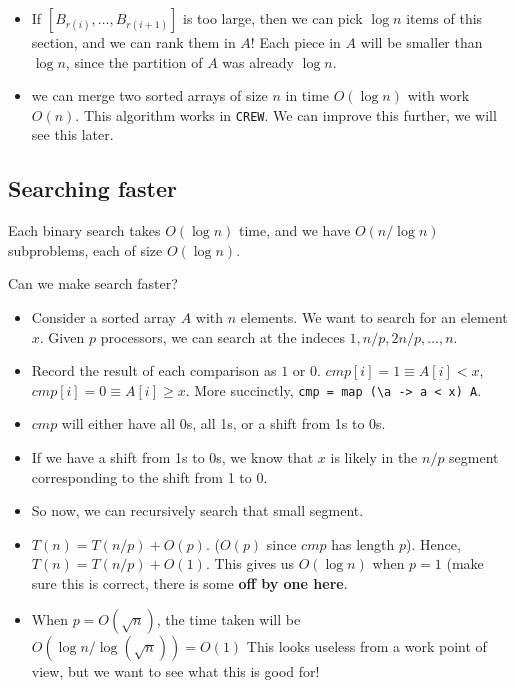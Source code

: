 \begin{itemize}
    \item If $[B_{r(i)}, \dots, B_{r(i + 1)}]$ is too large, then we can
        pick $\log n$ items of this section, and we can rank them in $A$!
        Each piece in $A$ will be smaller than $\log n$, since the partition
        of $A$ was already $\log n$.

    \item we can merge two sorted arrays of size $n$ in time $O(\log n)$
        with work $O(n)$.  This algorithm works in \texttt{CREW}.
        We can improve this  further, we will see this later.
\end{itemize}

\subsection{Searching faster}

Each binary search takes $O(\log n)$ time, and we have $O(n / \log n)$ subproblems,
each of size $O(\log n)$. 

Can we make search faster?

\begin{itemize}
    \item Consider a sorted array $A$ with $n$ elements. We want to search
        for an element $x$.
        Given $p$ processors, we can search at the indeces $1, n / p, 2n/p, \dots, n$.

    \item Record the result of each comparison as $1$ or $0$.
        $cmp[i] = 1 \equiv A[i] < x$, $cmp[i] = 0 \equiv A[i] \geq x$.
        More succinctly, \verb|cmp = map (\a -> a < x) A|.

    \item $cmp$ will either have all 0s, all 1s, or a shift from 1s to 0s.

    \item If we have a shift from 1s to 0s, we know that $x$ is likely
        in the $n/p$ segment corresponding to the shift from 1 to 0.

    \item So now, we can recursively search that small segment.

    \item $T(n) = T(n / p) + O(p)$. ($O(p)$ since $cmp$ has length $p$).
        Hence, $T(n) = T(n / p) + O(1)$. This gives us $O(\log n)$ when $p = 1$
        (make sure this is correct, there is some \textbf{off by one here}.

    \item When $p = O(\sqrt n)$, the time taken will be $O(\log n / \log (\sqrt n)) = O(1)$
        This looks useless from a work point of view, but we want to see what this is
        good for!
\end{itemize}

